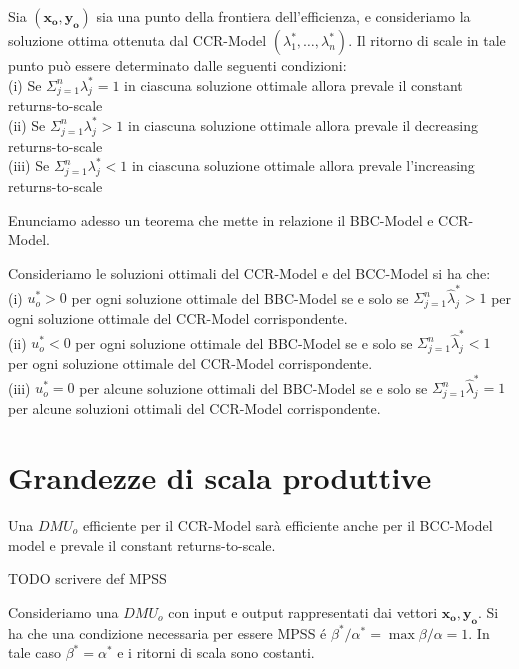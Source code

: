 \begin{teor}
Sia $(\boldsymbol{x_o, y_o})$ sia una punto della frontiera dell'efficienza, e consideriamo la soluzione ottima ottenuta dal CCR-Model $(\lambda^*_1, \dots, \lambda^*_n)$. Il ritorno di scale in tale punto può essere determinato dalle seguenti condizioni:\\
(i) Se $\Sigma^n_{j = 1} \lambda^*_j = 1$ in ciascuna soluzione ottimale allora prevale il constant returns-to-scale \\
(ii) Se $\Sigma^n_{j = 1} \lambda^*_j > 1$ in ciascuna soluzione ottimale allora prevale il decreasing returns-to-scale \\
(iii) Se $\Sigma^n_{j = 1} \lambda^*_j < 1$ in ciascuna soluzione ottimale allora prevale l'increasing returns-to-scale \\
\end{teor}

Enunciamo adesso un teorema che mette in relazione il BBC-Model e CCR-Model.

\begin{teor}
Consideriamo le soluzioni ottimali del CCR-Model e del BCC-Model si ha che: \\
(i) $u^*_o > 0$ per ogni soluzione ottimale del BBC-Model se e solo se $\Sigma^n_{j = 1} \hat{\lambda}^*_j > 1$ per ogni soluzione ottimale del CCR-Model corrispondente.\\
(ii) $u^*_o < 0$ per ogni soluzione ottimale del BBC-Model se e solo se $\Sigma^n_{j = 1} \hat{\lambda}^*_j < 1$ per ogni soluzione ottimale del CCR-Model corrispondente.\\
(iii) $u^*_o = 0$ per alcune soluzione ottimali del BBC-Model se e solo se $\Sigma^n_{j = 1} \hat{\lambda}^*_j = 1$ per alcune soluzioni ottimali del CCR-Model corrispondente.\\
\end{teor}

\section{Grandezze di scala produttive}

\begin{teor} Una $DMU_o$ efficiente per il CCR-Model sarà efficiente anche per il BCC-Model model e prevale il constant returns-to-scale.
\end{teor}
TODO scrivere def MPSS
\begin{teor} Consideriamo una $DMU_o$ con input e output rappresentati dai vettori $\boldsymbol{x_o, y_o}$. Si ha che una condizione necessaria per essere MPSS \'e  $\beta^*/\alpha^* = \max \beta/\alpha = 1$. In tale caso $\beta^* = \alpha^*$ e i ritorni di scala sono costanti. 
\end{teor}
